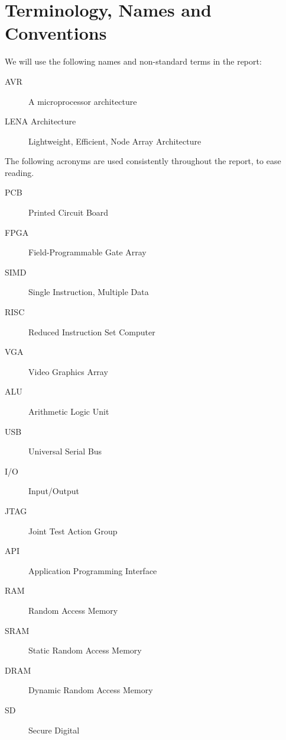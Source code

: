\section{Terminology, Names and Conventions}

We will use the following names and non-standard terms in the report:

\begin{description}
\item[AVR] A microprocessor architecture
\item[LENA Architecture] Lightweight, Efficient, Node Array Architecture
\end{description}

The following acronyms are used consistently throughout the report, to ease
reading.

\begin{description}
\item[PCB] Printed Circuit Board
\item[FPGA] Field-Programmable Gate Array
\item[SIMD] Single Instruction, Multiple Data
\item[RISC] Reduced Instruction Set Computer
\item[VGA] Video Graphics Array
\item[ALU] Arithmetic Logic Unit
\item[USB] Universal Serial Bus
\item[I/O] Input/Output
\item[JTAG] Joint Test Action Group
\item[API] Application Programming Interface
\item[RAM] Random Access Memory
\item[SRAM] Static Random Access Memory
\item[DRAM] Dynamic Random Access Memory
\item[SD] Secure Digital
\end{description}
